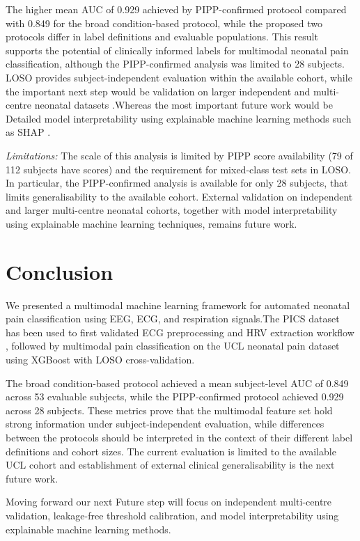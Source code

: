\documentclass[conference]{IEEEtran}
\begin{document}
The higher mean AUC of 0.929 achieved by PIPP-confirmed protocol compared with 0.849 for the broad condition-based protocol, while the proposed two protocols differ in label definitions and evaluable populations. This result supports the potential of clinically informed labels for multimodal neonatal pain classification, although the PIPP-confirmed analysis was limited to 28 subjects. LOSO provides subject-independent evaluation within the available cohort, while the important next step would be validation on larger independent and multi-centre neonatal datasets .Whereas the most important future work would be Detailed model interpretability using explainable machine learning methods such as SHAP .

\textit{Limitations:} The scale of this analysis is limited by PIPP score availability (79 of 112 subjects have scores) and the requirement for mixed-class test sets in LOSO. In particular, the PIPP-confirmed analysis is available for only 28 subjects, that limits generalisability to the available cohort. External validation on independent and larger multi-centre neonatal cohorts, together with model interpretability using explainable machine learning techniques, remains future work.

\section{Conclusion}

We presented a multimodal machine learning framework for automated neonatal pain classification using EEG, ECG, and respiration signals.The PICS dataset has been used to first validated ECG preprocessing and HRV extraction workflow , followed by multimodal pain classification on the UCL neonatal pain dataset using XGBoost with LOSO cross-validation.

The broad condition-based protocol achieved a mean subject-level AUC of 0.849 across 53 evaluable subjects, while the PIPP-confirmed protocol achieved 0.929 across 28 subjects. These metrics prove that the multimodal feature set hold strong information under subject-independent evaluation, while differences between the protocols should be interpreted in the context of their different label definitions and cohort sizes. The current evaluation is limited to the available UCL cohort and establishment of external clinical generalisability is the next future work.

Moving forward our next Future step will focus on independent multi-centre validation, leakage-free threshold calibration, and model interpretability using explainable machine learning methods.



\end{document}
